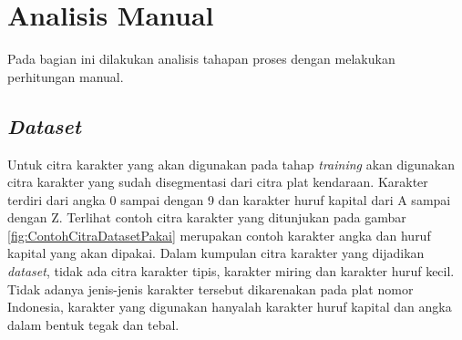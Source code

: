 
\section{Analisis Manual}
\noindent Pada bagian ini dilakukan analisis tahapan proses dengan melakukan perhitungan manual.\\

\subsection{\textit{Dataset}}
\noindent Untuk citra karakter yang akan digunakan pada tahap \textit{training} akan digunakan citra karakter yang sudah disegmentasi dari citra plat kendaraan. Karakter terdiri dari angka 0 sampai dengan 9 dan karakter huruf kapital dari A sampai dengan Z. Terlihat contoh citra karakter yang ditunjukan pada gambar \ref{fig:ContohCitraDatasetPakai} merupakan contoh karakter angka dan huruf kapital yang akan dipakai. Dalam kumpulan citra karakter yang dijadikan \textit{dataset}, tidak ada citra karakter tipis, karakter miring dan karakter huruf kecil. Tidak adanya jenis-jenis karakter tersebut dikarenakan pada plat nomor Indonesia, karakter yang digunakan hanyalah karakter huruf kapital dan angka dalam bentuk tegak dan tebal.

